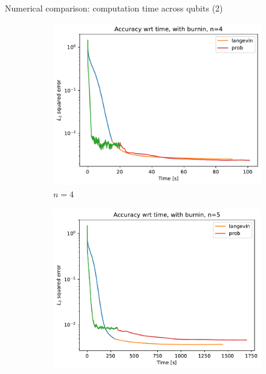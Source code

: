\documentclass{beamer}
\begin{document}
\begin{frame}{Numerical comparison: computation time across qubits (2)}
\begin{figure}[H]
\begin{subfigure}[b]{0.4\textwidth}
            \includegraphics[width=\textwidth]{figures/experiments/baseline/diff_n_qubits/iters_acc_comp_time_no_avg_n4-1.png}
    
            \caption{$n=4$}
    
            \label{fig:conv-plot-diff-n-4-sub}
    
        \end{subfigure}
    
        \begin{subfigure}[b]{0.4\textwidth}
    
    
            \centering
            \includegraphics[width=\linewidth]{figures/experiments/baseline/diff_n_qubits/iters_acc_comp_time_no_avg_n5-1.png}
        \end{subfigure}
            \quad
            \begin{minipage}[b]{.1\textwidth}
            \end{minipage}
    
        \label{fig:conv-plot-diff-n}
    
    \end{figure}
\end{frame}
\end{document}
